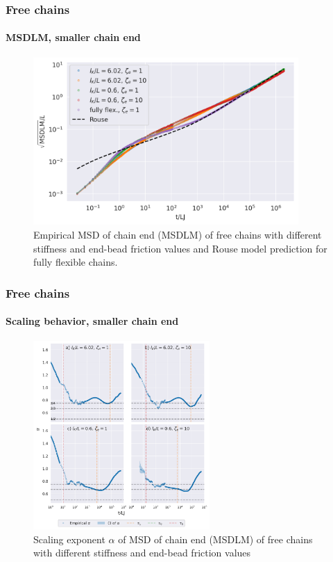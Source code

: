 \documentclass[handout]{beamer}
\begin{document}
\begin{frame}
    \frametitle{Free chains}
    \framesubtitle{MSDLM, smaller chain end}
    \begin{figure}[h]
        \includegraphics[width=0.9\textwidth]{17+18+19+20-exp-msd-fm-log.png}
        \caption{
            Empirical MSD of chain end (MSDLM) of free chains
            with different stiffness and end-bead friction values and
            Rouse model prediction for fully flexible chains.
        }
    \end{figure}
\end{frame}


\begin{frame}
    \frametitle{Free chains}
    \framesubtitle{Scaling behavior, smaller chain end}
    \begin{figure}
        \centering
        \includegraphics[width=0.6\textwidth]{17+18+19+20-exp-alpha-fm.png}
        \caption{Scaling exponent $\alpha$ of MSD of chain end (MSDLM) 
        of free chains with different stiffness and end-bead friction values
        }
        \label{fig:alpha_fm_free}
    \end{figure}
\end{frame}
\end{document}

